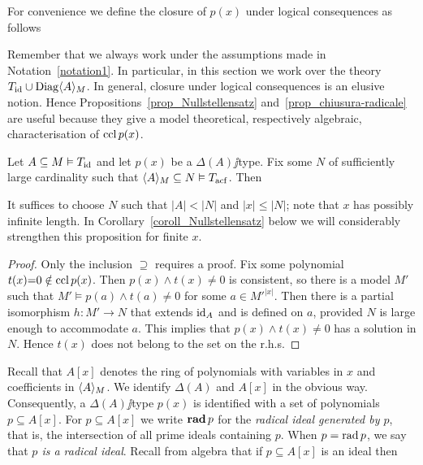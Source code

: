 \documentclass[creche.tex]{subfiles}
\begin{document}
For convenience we define the closure of $p(x)$ under logical consequences as follows


Remember that we always work under the assumptions made in Notation~\ref{notation1}. In particular, in this section we work over the theory $T_{\rm id}\cup\Diag\<A\>_M$. In general, closure under logical consequences is an elusive notion. Hence Propositions~\ref{prop_Nullstellensatz} and~\ref{prop_chiusura-radicale} are useful because they give a model theoretical, respectively algebraic, characterisation of $\ccl\, p(x)$.

\begin{proposition}\label{prop_Nullstellensatz}
Let $A\subseteq M\models T_{\rm id}$ and let $p(x)$ be a $\Delta(A)\jj$type. Fix some $N$ of sufficiently large cardinality such that $\<A\>_M\subseteq N\models T_{\rm acf}$. Then 


\end{proposition}

It suffices to choose $N$ such that $|A|<|N|$ and $|x|\le |N|$; note that $x$ has possibly infinite length. In Corollary~\ref{coroll_Nullstellensatz} below we will considerably strengthen this proposition for finite $x$.

\begin{proof} Only the inclusion $\supseteq$ requires a proof.  Fix some polynomial $t(x){=}0\notin\ccl\, p(x)$. Then $p(x)\wedge t(x)\neq0$ is consistent, so there is a model $M'$ such that $M'\models p(a)\wedge t(a)\neq0$ for some $a\in {M'}^{|x|}$. Then there is a partial isomorphism $h:M'\to N$ that extends $\id_A$ and is defined on $a$, provided $N$ is large enough to accommodate $a$. This implies that $p(x)\wedge t(x)\neq0$ has a solution in $N$. Hence $t(x)$ does not belong to the set on the r.h.s.  
\end{proof}

Recall that $A[x]$ denotes the ring of polynomials with variables in $x$ and coefficients in $\<A\>_M$. We identify $\Delta(A)$ and $A[x]$ in the obvious way. Consequently, a $\Delta(A)\jj$type $p(x)$ is identified with a set of polynomials $p\subseteq A[x]$. For $p\subseteq A[x]$ we write \emph{${\rm\bf rad}\,p$} for the \emph{radical ideal generated by $p$}, that is, the intersection of all prime ideals containing $p$. When $p=\rad p$, we say that  \emph{$p$ is a radical ideal}. Recall from algebra that if $p\subseteq A[x]$ is an ideal then
\end{document}
